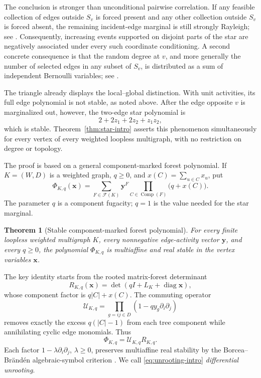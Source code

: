 \documentclass[11pt]{article}
\numberwithin{equation}{section}
\newtheorem{theorem}{Theorem}[section]
\newcommand{\cF}{\mathcal F}
\newcommand{\yy}{\bm y}
\newcommand{\xx}{\bm x}
\newcommand{\diag}{\operatorname{diag}}
\newcommand{\Comp}{\operatorname{Comp}}
\begin{document}
The conclusion is stronger than unconditional pairwise correlation.  If any feasible collection of edges outside $S_v$ is forced present and any other collection outside $S_v$ is forced absent, the remaining incident-edge marginal is still strongly Rayleigh; see .  Consequently, increasing events supported on disjoint parts of the star are negatively associated under every such coordinate conditioning.  A second concrete consequence is that the random degree at $v$, and more generally the number of selected edges in any subset of $S_v$, is distributed as a sum of independent Bernoulli variables; see .

The triangle already displays the local--global distinction.  With unit activities, its full edge polynomial is not stable, as noted above.  After the edge opposite $v$ is marginalized out, however, the two-edge star polynomial is
\[
 2+2z_1+2z_2+z_1z_2,
\]
which is stable.  Theorem~\ref{thm:star-intro} asserts this phenomenon simultaneously for every vertex of every weighted loopless multigraph, with no restriction on degree or topology.

The proof is based on a general component-marked forest polynomial.  If $K=(W,D)$ is a weighted graph, $q\geq0$, and $x(C)=\sum_{u\in C}x_u$, put
\begin{equation}\label{eq:Phi-intro}
 \Phi_{K,q}(\xx)
 =\sum_{F\in\cF(K)}\yy^F
  \prod_{C\in\Comp(F)}\bigl(q+x(C)\bigr).
\end{equation}
The parameter $q$ is a component fugacity; $q=1$ is the value needed for the star marginal.

\begin{theorem}[Stable component-marked forest polynomial]\label{thm:Phi-intro}
For every finite loopless weighted multigraph $K$, every nonnegative edge-activity vector $\yy$, and every $q\geq0$, the polynomial $\Phi_{K,q}$ is multiaffine and real stable in the vertex variables $\xx$.
\end{theorem}

The key identity starts from the rooted matrix-forest determinant
\[
 R_{K,q}(\xx)=\det\!\left(qI+L_K+\diag\xx\right),
\]
whose component factor is $q|C|+x(C)$.  The commuting operator
\[
 \mathcal U_{K,q}
 =\prod_{g=ij\in D}\left(1-qy_g\partial_i\partial_j\right)
\]
removes exactly the excess $q(|C|-1)$ from each tree component while annihilating cyclic edge monomials.  Thus
\begin{equation}\label{eq:unrooting-intro}
 \Phi_{K,q}=\mathcal U_{K,q}R_{K,q}.
\end{equation}
Each factor $1-\lambda\partial_i\partial_j$, $\lambda\geq0$, preserves multiaffine real stability by the Borcea--Br\"and\'en algebraic-symbol criterion \cite{BorceaBranden2009}.  We call \eqref{eq:unrooting-intro} \emph{differential unrooting}.
\end{document}
